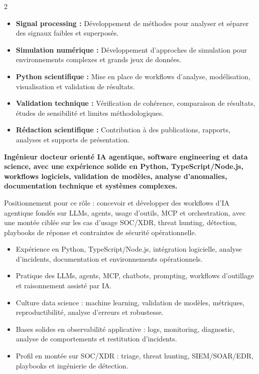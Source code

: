\documentclass[8pt,a4paper,ragged2e,withhyper]{altacv}
\begin{document}
\begin{paracol}{2}
\begin{itemize}
  \item \textbf{Signal processing :} Développement de méthodes pour analyser et séparer des signaux faibles et superposés.
  \item \textbf{Simulation numérique :} Développement d’approches de simulation pour environnements complexes et grands jeux de données.
  \item \textbf{Python scientifique :} Mise en place de workflows d’analyse, modélisation, visualisation et validation de résultats.
  \item \textbf{Validation technique :} Vérification de cohérence, comparaison de résultats, études de sensibilité et limites méthodologiques.
  \item \textbf{Rédaction scientifique :} Contribution à des publications, rapports, analyses et supports de présentation.
\end{itemize}

\switchcolumn


\textbf{Ingénieur docteur orienté IA agentique, software engineering et data science, avec une expérience solide en Python, TypeScript/Node.js, workflows logiciels, validation de modèles, analyse d’anomalies, documentation technique et systèmes complexes.}

Positionnement pour ce rôle : concevoir et développer des workflows d’IA agentique fondés sur LLMs, agents, usage d’outils, MCP et orchestration, avec une montée ciblée sur les cas d’usage SOC/XDR, threat hunting, détection, playbooks de réponse et contraintes de sécurité opérationnelle.

\begin{itemize}
  \item Expérience en Python, TypeScript/Node.js, intégration logicielle, analyse d’incidents, documentation et environnements opérationnels.
  \item Pratique des LLMs, agents, MCP, chatbots, prompting, workflows d’outillage et raisonnement assisté par IA.
  \item Culture data science : machine learning, validation de modèles, métriques, reproductibilité, analyse d’erreurs et robustesse.
  \item Bases solides en observabilité applicative : logs, monitoring, diagnostic, analyse de comportements et restitution d’incidents.
  \item Profil en montée sur SOC/XDR : triage, threat hunting, SIEM/SOAR/EDR, playbooks et ingénierie de détection.
\end{itemize}


\end{paracol}
\end{document}
